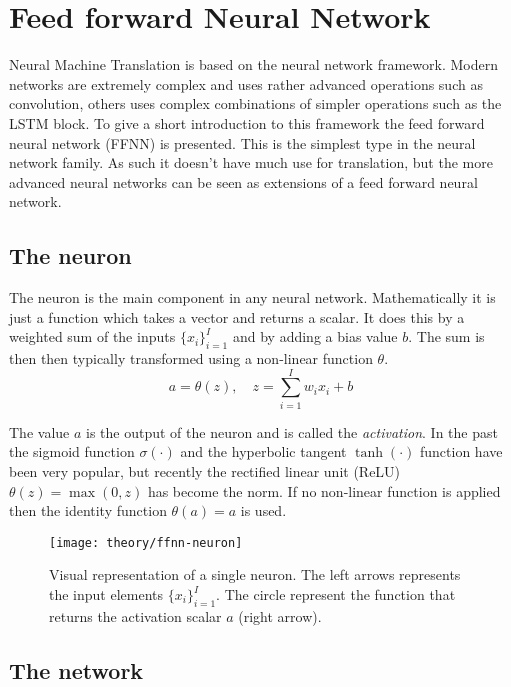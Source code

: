 \section{Feed forward Neural Network}
\label{sec:theory:ffnn}

Neural Machine Translation is based on the neural network framework. Modern networks are extremely complex and uses rather advanced operations such as convolution, others uses complex combinations of simpler operations such as the LSTM block. To give a short introduction to this framework the feed forward neural network (FFNN) is presented. This is the simplest type in the neural network family. As such it doesn't have much use for translation, but the more advanced neural networks can be seen as extensions of a feed forward neural network.

\subsection{The neuron}

The neuron is the main component in any neural network. Mathematically it is just a function which takes a vector and returns a scalar. It does this by a weighted sum of the inputs $\{ x_i \}_{i=1}^I$ and by adding a bias value $b$. The sum is then then typically transformed using a non-linear function $\theta$.
\begin{equation}
a = \theta(z),\quad z = \sum_{i=1}^I w_{i} x_i + b
\end{equation}

The value $a$ is the output of the neuron and is called the \textit{activation}. In the past the sigmoid function $\sigma(\cdot)$ and the hyperbolic tangent $\tanh(\cdot)$ function have been very popular\cite{bishop}, but recently the rectified linear unit (ReLU) $\theta(z) = \max(0, z)$ has become the norm. If no non-linear function is applied then the identity function $\theta(a) = a$ is used.

\begin{figure}[H]
	\centering
	\texttt{[image: theory/ffnn-neuron]}
	\caption{Visual representation of a single neuron. The left arrows represents the input elements $\{ x_i \}_{i=1}^I$. The circle represent the function that returns the activation scalar $a$ (right arrow).}
\end{figure}

\subsection{The network}

